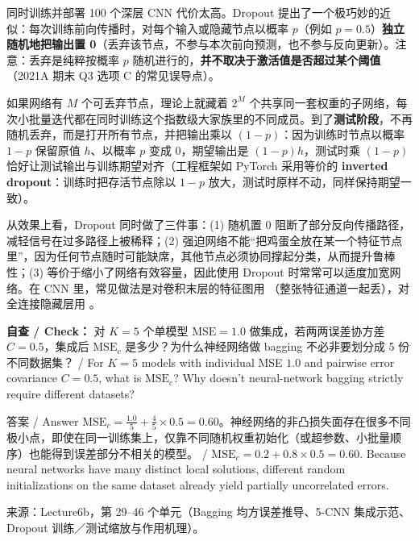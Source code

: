 
同时训练并部署 100 个深层 CNN 代价太高。Dropout 提出了一个极巧妙的近似：每次训练前向传播时，对每个输入或隐藏节点以概率 $p$（例如 $p=0.5$）\textbf{独立随机地把输出置 0}（丢弃该节点，不参与本次前向预测，也不参与反向更新）。注意：丢弃是纯粹按概率 $p$ 随机进行的，\textbf{并不取决于激活值是否超过某个阈值}（2021A 期末 Q3 选项 C 的常见误导点）。

如果网络有 $M$ 个可丢弃节点，理论上就藏着 $2^M$ 个共享同一套权重的子网络，每次小批量迭代都在同时训练这个指数级大家族里的不同成员。到了\textbf{测试阶段}，不再随机丢弃，而是打开所有节点，并把输出乘以 $(1-p)$：因为训练时节点以概率 $1-p$ 保留原值 $h$、以概率 $p$ 变成 0，期望输出是 $(1-p)h$，测试时乘 $(1-p)$ 恰好让测试输出与训练期望对齐（工程框架如 PyTorch 采用等价的 \textbf{inverted dropout}：训练时把存活节点除以 $1-p$ 放大，测试时原样不动，同样保持期望一致）。

从效果上看，Dropout 同时做了三件事：(1) 随机置 0 阻断了部分反向传播路径，减轻信号在过多路径上被稀释；(2) 强迫网络不能“把鸡蛋全放在某一个特征节点里”，因为任何节点随时可能缺席，其他节点必须协同撑起分类，从而提升鲁棒性；(3) 等价于缩小了网络有效容量，因此使用 Dropout 时常常可以适度加宽网络。在 CNN 里，常见做法是对卷积末层的特征图用 （整张特征通道一起丢），对全连接隐藏层用 。

\textbf{自查 / Check：} 对 $K=5$ 个单模型 $\mathrm{MSE}=1.0$ 做集成，若两两误差协方差 $C=0.5$，集成后 $\mathrm{MSE}_c$ 是多少？为什么神经网络做 bagging 不必非要划分成 5 份不同数据集？ / For $K=5$ models with individual MSE $1.0$ and pairwise error covariance $C=0.5$, what is $\mathrm{MSE}_c$? Why doesn't neural-network bagging strictly require different datasets?

\begin{StudySolution}{答案 / Answer}
$\mathrm{MSE}_c = \frac{1.0}{5} + \frac{4}{5}\times 0.5 = 0.60$。神经网络的非凸损失面存在很多不同极小点，即使在同一训练集上，仅靠不同随机权重初始化（或超参数、小批量顺序）也能得到误差部分不相关的模型。 / $\mathrm{MSE}_c = 0.2 + 0.8\times 0.5 = 0.60$. Because neural networks have many distinct local solutions, different random initializations on the same dataset already yield partially uncorrelated errors.
\end{StudySolution}

来源：Lecture6b，第 29–46 个单元（Bagging 均方误差推导、5-CNN 集成示范、Dropout 训练／测试缩放与作用机理）。


